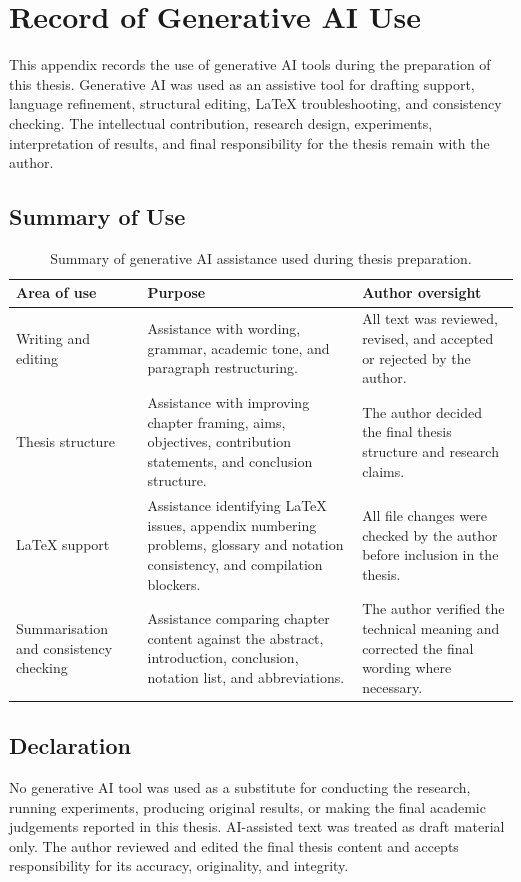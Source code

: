 \chapter{Record of Generative AI Use}
\label{app:ai-use}

This appendix records the use of generative AI tools during the preparation of
this thesis. Generative AI was used as an assistive tool for drafting support,
language refinement, structural editing, LaTeX troubleshooting, and consistency
checking. The intellectual contribution, research design, experiments,
interpretation of results, and final responsibility for the thesis remain with
the author.

\section{Summary of Use}

\begin{table}[H]
\centering
\small
\begin{tabularx}{\textwidth}{@{}p{}p{}X@{}}
\toprule
\textbf{Area of use} & \textbf{Purpose} & \textbf{Author oversight} \\
\midrule
Writing and editing & Assistance with wording, grammar, academic tone, and
paragraph restructuring. & All text was reviewed, revised, and accepted or
rejected by the author. \\
Thesis structure & Assistance with improving chapter framing, aims,
objectives, contribution statements, and conclusion structure. & The author
decided the final thesis structure and research claims. \\
LaTeX support & Assistance identifying LaTeX issues, appendix numbering
problems, glossary and notation consistency, and compilation blockers. & All
file changes were checked by the author before inclusion in the thesis. \\
Summarisation and consistency checking & Assistance comparing chapter content
against the abstract, introduction, conclusion, notation list, and
abbreviations. & The author verified the technical meaning and corrected the
final wording where necessary. \\
\bottomrule
\end{tabularx}
\caption{Summary of generative AI assistance used during thesis preparation.}
\label{tab:ai-use-summary}
\end{table}

\section{Declaration}

No generative AI tool was used as a substitute for conducting the research,
running experiments, producing original results, or making the final academic
judgements reported in this thesis. AI-assisted text was treated as draft
material only. The author reviewed and edited the final thesis content and
accepts responsibility for its accuracy, originality, and integrity.
